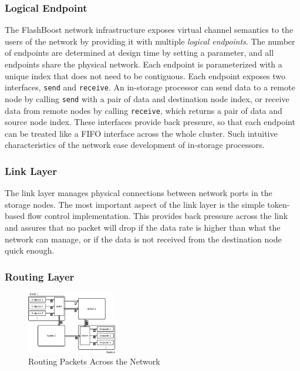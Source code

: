\subsubsection{Logical Endpoint}

The FlashBoost network infrastructure exposes virtual channel semantics to the
users of the network by providing it with multiple \emph{logical endpoints}.  The
number of endpoints are determined at design time by setting a parameter, and
all endpoints share the physical network.  Each endpoint is parameterized with a
unique index that does not need to be contiguous.  Each endpoint exposes two
interfaces, \texttt{send} and \texttt{receive}. An in-storage processor can send
data to a remote node by calling \texttt{send} with a pair of data and
destination node index, or receive data from remote nodes by calling
\texttt{receive}, which returns a pair of data and source node index. These
interfaces provide back pressure, so that each endpoint can be treated like a
FIFO interface across the whole cluster. Such intuitive characteristics of the
network ease development of in-storage processors.

\subsubsection{Link Layer}

The link layer manages physical connections between network ports in the storage
nodes. The most important aspect of the link layer is the simple token-based
flow control implementation. This provides back pressure across the link and
assures that no packet will drop if the data rate is higher than what the
network can manage, or if the data is not received from the destination node
quick enough.

\subsubsection{Routing Layer}


\begin{figure}[h]
	\begin{center}
	\includegraphics[width=0.35\textwidth]{figures/routing-crop.pdf}
	\caption{Routing Packets Across the Network}
	\label{fig:networkrouting}
	\end{center}
\end{figure}

